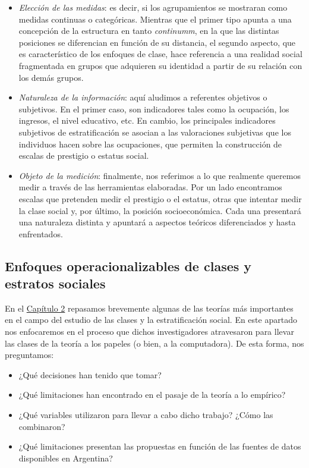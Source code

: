 \documentclass[
]{article}
\providecommand{\tightlist}{%
  \setlength{\itemsep}{0pt}\setlength{\parskip}{0pt}}
\begin{document}
\begin{itemize}
\item
  \emph{Elección de las medidas}: es decir, si los agrupamientos se mostraran como medidas continuas o categóricas. Mientras que el primer tipo apunta a una concepción de la estructura en tanto \emph{continumm}, en la que las distintas posiciones se diferencian en función de su distancia, el segundo aspecto, que es característico de los enfoques de clase, hace referencia a una realidad social fragmentada en grupos que adquieren su identidad a partir de su relación con los demás grupos.
\item
  \emph{Naturaleza de la información}: aquí aludimos a referentes objetivos o subjetivos. En el primer caso, son indicadores tales como la ocupación, los ingresos, el nivel educativo, etc. En cambio, los principales indicadores subjetivos de estratificación se asocian a las valoraciones subjetivas que los individuos hacen sobre las ocupaciones, que permiten la construcción de escalas de prestigio o estatus social.
\item
  \emph{Objeto de la medición}: finalmente, nos referimos a lo que realmente queremos medir a través de las herramientas elaboradas. Por un lado encontramos escalas que pretenden medir el prestigio o el estatus, otras que intentar medir la clase social y, por último, la posición socioeconómica. Cada una presentará una naturaleza distinta y apuntará a aspectos teóricos diferenciados y hasta enfrentados.
\end{itemize}

\hypertarget{clases6}{%
\subsection{Enfoques operacionalizables de clases y estratos sociales}\label{clases6}}

En el \protect\hyperlink{estructura1}{Capítulo 2} repasamos brevemente algunas de las teorías más importantes en el campo del estudio de las clases y la estratificación social. En este apartado nos enfocaremos en el proceso que dichos investigadores atravesaron para llevar las clases de la teoría a los papeles (o bien, a la computadora). De esta forma, nos preguntamos:

\begin{itemize}
\tightlist
\item
  ¿Qué decisiones han tenido que tomar?
\item
  ¿Qué limitaciones han encontrado en el pasaje de la teoría a lo empírico?
\item
  ¿Qué variables utilizaron para llevar a cabo dicho trabajo? ¿Cómo las combinaron?
\item
  ¿Qué limitaciones presentan las propuestas en función de las fuentes de datos disponibles en Argentina?
\end{itemize}
\end{document}

